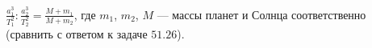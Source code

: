 $\frac{a_1^3}{T_1^2}:\frac{a_2^3}{T_2^2}=\frac{M+m_1}{M+m_2}$, где
$m_1$, $m_2$, $M$ --- массы планет и Солнца соответственно (сравнить с
ответом к задаче $51.26$).
